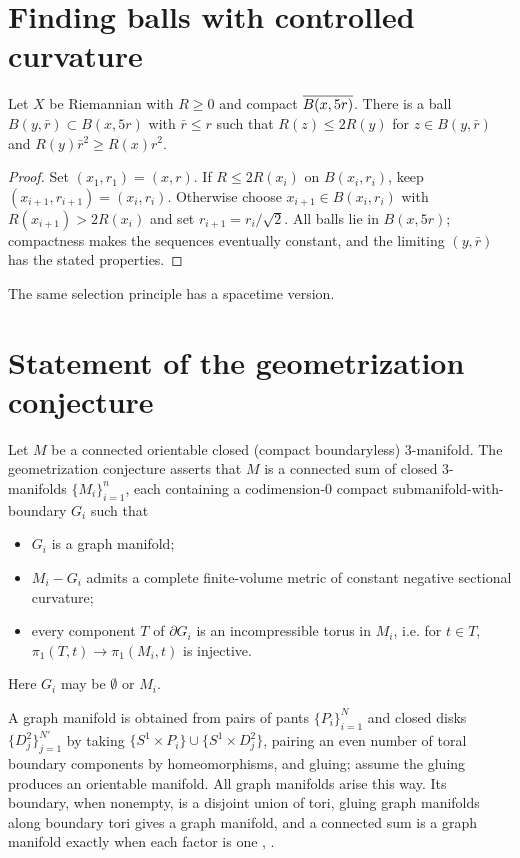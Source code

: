 \section{Finding balls with controlled curvature} \label{pointpicking}

\begin{lemma}
  \label{lem:kl-finding-balls-controlled-curvature-existence-curvature}
\label{selection}

Let $X$ be Riemannian with $R\geq0$ and compact
$\overline{B(x,5r)}$. There is a ball $B(y,\bar r)\subset B(x,5r)$ with
$\bar r\leq r$ such that $R(z)\leq2R(y)$ for $z\in B(y,\bar r)$ and
$R(y)\bar r^2\geq R(x)r^2$.
\end{lemma}
\begin{proof}
\sketch
Set $(x_1,r_1)=(x,r)$. If $R\leq2R(x_i)$ on $B(x_i,r_i)$, keep
$(x_{i+1},r_{i+1})=(x_i,r_i)$. Otherwise choose
$x_{i+1}\in B(x_i,r_i)$ with $R(x_{i+1})>2R(x_i)$ and set
$r_{i+1}=r_i/\sqrt2$. All balls lie in $B(x,5r)$; compactness makes the
sequences eventually constant, and the limiting $(y,\bar r)$ has the stated
properties.
\end{proof}

The same selection principle has a spacetime version.

\section{Statement of the geometrization conjecture} \label{geom}

Let $M$ be a connected orientable closed (compact boundaryless) $3$-manifold.
The geometrization conjecture asserts that $M$ is a connected sum of closed
$3$-manifolds $\{M_i\}_{i=1}^n$, each containing a codimension-$0$ compact
submanifold-with-boundary $G_i$ such that
\begin{itemize}
\item $G_i$ is a graph manifold;
\item $M_i-G_i$ admits a complete finite-volume metric of constant negative
sectional curvature;
\item every component $T$ of $\partial G_i$ is an incompressible torus in
$M_i$, i.e. for $t\in T$, $\pi_1(T,t)\rightarrow\pi_1(M_i,t)$ is injective.
\end{itemize}
Here $G_i$ may be $\emptyset$ or $M_i$.

A graph manifold is obtained from pairs of pants $\{P_i\}_{i=1}^N$ and
closed disks $\{D_j^2\}_{j=1}^{N'}$ by taking
$\{S^1\times P_i\}\cup\{S^1\times D_j^2\}$, pairing an even number of
toral boundary components by homeomorphisms, and gluing; assume the gluing
produces an orientable manifold. All graph manifolds arise this way. Its
boundary, when nonempty, is a disjoint union of tori, gluing graph manifolds
along boundary tori gives a graph manifold, and a connected sum is a graph
manifold exactly when each factor is one \cite[Chapter 2.4]{Matveev},
\cite[Proposition 2.4.3]{Matveev}.


